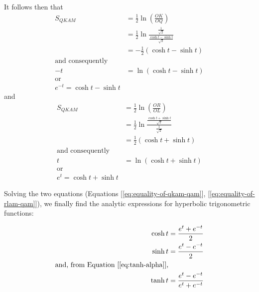 \documentclass[11pt]{article}
\theoremstyle{definition}
\theoremstyle{plain}
\theoremstyle{problemstyle}
\theoremstyle{remark}
\theoremstyle{definition}
\begin{document}
It follows then that
\begin{equation}
\label{eq:equality-of-qkam-qam}
    \begin{aligned}
        S_{QKAM}&=\frac{1}{2}\ln(\frac{OK}{OQ})\\
                &=\frac{1}{2}\ln\frac{\frac{1}{\sqrt{2}}}{\frac{\cosh{t}-\sinh{t}}{\sqrt{2}}}\\
                &=-\frac{1}{2}(\cosh{t}-\sinh{t})\\
                \text{and consequently}\\
             -t &=\ln({\cosh{t}-\sinh{t}})\\
                \text{or}\\
                e^{-t}=\cosh{t}-\sinh{t}
    \end{aligned}
\end{equation}
and
\begin{equation}
\label{eq:equality-of-rlam-qam}
    \begin{aligned}
        S_{QKAM}&=\frac{1}{2}\ln(\frac{OR}{OL})\\
                &=\frac{1}{2}\ln\frac{\frac{\cosh{t}+\sinh{t}}{\sqrt{2}}}{\frac{1}{\sqrt{2}}}\\
                &=\frac{1}{2}(\cosh{t}+\sinh{t})\\
                \text{and consequently}\\
             t  &=\ln({\cosh{t}+\sinh{t}})\\
                \text{or}\\
                e^t=\cosh{t}+\sinh{t}
    \end{aligned}
\end{equation}

Solving the two equations (Equations [\ref{eq:equality-of-qkam-qam}], [\ref{eq:equality-of-rlam-qam}]), we finally find the analytic expressions for hyperbolic trigonometric functions:

\begin{equation}
\label{eq:the-analytic-expressions}
    \begin{aligned}
        \cosh{t}&=\frac{e^t+e^{-t}}{2}\\
        \sinh{t}&=\frac{e^t-e^{-t}}{2}\\
        \text{and, from Equation [\ref{eq:tanh-alpha}],}\\
        \tanh{t}&=\frac{e^t-e^{-t}}{e^{t}+e^{-t}}
    \end{aligned}
\end{equation}
\end{document}
